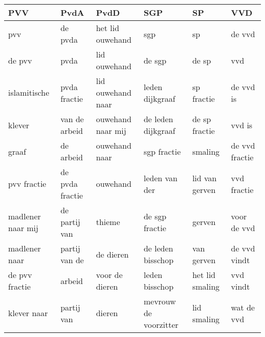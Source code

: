 \begin{tabular}{llllll}
\toprule
               PVV &             PvdA &               PvdD &                    SGP &               SP &             VVD \\
\midrule
               pvv &          de pvda &   het lid ouwehand &                    sgp &               sp &          de vvd \\
            de pvv &             pvda &       lid ouwehand &                 de sgp &            de sp &             vvd \\
      islamitische &     pvda fractie &  lid ouwehand naar &        leden dijkgraaf &       sp fractie &       de vvd is \\
            klever &    van de arbeid &  ouwehand naar mij &     de leden dijkgraaf &    de sp fractie &          vvd is \\
             graaf &        de arbeid &      ouwehand naar &            sgp fractie &          smaling &  de vvd fractie \\
       pvv fractie &  de pvda fractie &           ouwehand &          leden van der &   lid van gerven &     vvd fractie \\
 madlener naar mij &    de partij van &             thieme &         de sgp fractie &           gerven &     voor de vvd \\
     madlener naar &    partij van de &          de dieren &      de leden bisschop &       van gerven &    de vvd vindt \\
    de pvv fractie &           arbeid &     voor de dieren &         leden bisschop &  het lid smaling &       vvd vindt \\
       klever naar &       partij van &             dieren &  mevrouw de voorzitter &      lid smaling &      wat de vvd \\
\bottomrule
\end{tabular}
